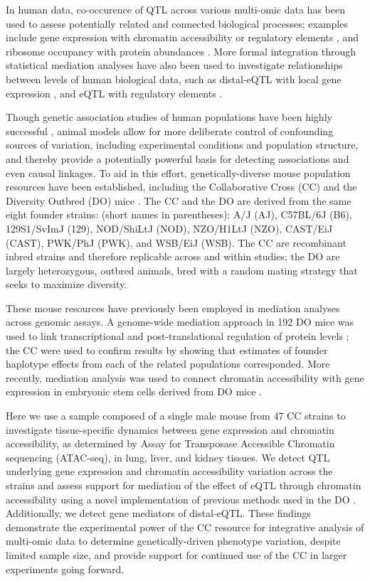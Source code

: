 \documentclass[10pt,letterpaper]{article}
\begin{document}
In human data, co-occurence of QTL across various multi-omic data has been used to assess potentially related and connected biological processes; examples include gene expression with chromatin accessibility \cite{Degner2012} or regulatory elements \cite{Pai2015},  and ribosome occupancy with protein abundances \cite{Battle2015, Yang2017}.
More formal integration through statistical mediation analyses have also been used to investigate relationships between levels of human biological data, such as distal-eQTL with local gene expression \cite{Battle2014}, and eQTL with regulatory elements \cite{Alasoo2017, Roytman2018, Wu2018}.

Though genetic association studies of human populations have been highly successful \cite{Visscher2017}, animal models allow for more deliberate control of confounding sources of variation, including experimental conditions and population structure, and thereby provide a potentially powerful basis for detecting associations and even causal linkages.
To aid in this effort, genetically-diverse mouse population resources have been established, including the Collaborative Cross (CC) \cite{Churchill2004,Hall2012,Srivastava2017} and the Diversity Outbred (DO) mice \cite{Churchill2012}. The CC and the DO are derived from the same eight founder strains: (short names in parentheses): A/J (AJ), C57BL/6J (B6), 129S1/SvImJ (129), NOD/ShiLtJ (NOD), NZO/H1LtJ (NZO), CAST/EiJ (CAST), PWK/PhJ (PWK), and WSB/EiJ (WSB). The CC are recombinant inbred strains and therefore replicable across and within studies; the DO are largely heterozygous, outbred animals, bred with a random mating strategy that seeks to maximize diversity. 

These mouse resources have previously been employed in mediation analyses across genomic assays. A genome-wide mediation approach in 192 DO mice was used to link transcriptional and post-translational regulation of protein levels \cite{Chick2016}; the CC were used to confirm results by showing that estimates of founder haplotype effects from each of the related populations corresponded. More recently, mediation analysis was used to connect chromatin accessibility with gene expression in embryonic stem cells derived from DO mice \cite{Skelly2019}.

Here we use a sample composed of a single male mouse from 47 CC strains to investigate tissue-specific dynamics between gene expression and chromatin accessibility, as determined by Assay for Transposase Accessible Chromatin sequencing (ATAC-seq), in lung, liver, and kidney tissues. We detect QTL underlying gene expression and chromatin accessibility variation across the strains and assess support for mediation of the effect of eQTL through chromatin accessibility using a novel implementation of previous methods used in the DO \cite{Chick2016}. Additionally, we detect gene mediators of distal-eQTL. 
These findings demonstrate the experimental power of the CC resource for integrative analysis of multi-omic data to determine genetically-driven phenotype variation, despite limited sample size, and provide support for continued use of the CC in larger experiments going forward.
\end{document}

